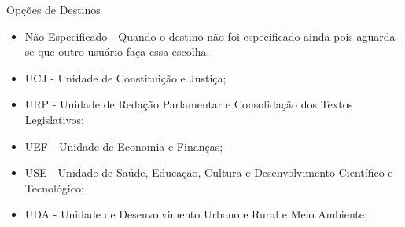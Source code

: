 \begin{nota}[1]{Opções de Destinos}
	\begin{itemize}
		\item Não Especificado - Quando o destino não foi especificado ainda pois aguarda-se que outro usuário faça essa escolha.
		\item UCJ - Unidade de Constituição e Justiça;
		\item URP - Unidade de Redação Parlamentar e Consolidação dos Textos Legislativos;
		\item UEF - Unidade de Economia e Finanças;
		\item USE - Unidade de Saúde, Educação, Cultura e Desenvolvimento Científico e Tecnológico; 
		\item UDA - Unidade de Desenvolvimento Urbano e Rural e Meio Ambiente;	
	\end{itemize}
\end{nota}





